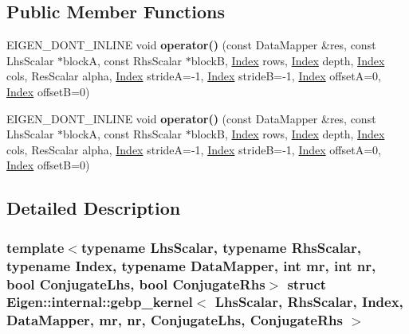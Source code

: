 \subsection*{Public Member Functions}
\begin{DoxyCompactItemize}
\item 
\mbox{\label{struct_eigen_1_1internal_1_1gebp__kernel_afd8f51fe544ebb1106bbae9698f8a1de}} 
E\+I\+G\+E\+N\+\_\+\+D\+O\+N\+T\+\_\+\+I\+N\+L\+I\+NE void {\bfseries operator()} (const Data\+Mapper \&res, const Lhs\+Scalar $\ast$blockA, const Rhs\+Scalar $\ast$blockB, \hyperlink{namespace_eigen_a62e77e0933482dafde8fe197d9a2cfde}{Index} rows, \hyperlink{namespace_eigen_a62e77e0933482dafde8fe197d9a2cfde}{Index} depth, \hyperlink{namespace_eigen_a62e77e0933482dafde8fe197d9a2cfde}{Index} cols, Res\+Scalar alpha, \hyperlink{namespace_eigen_a62e77e0933482dafde8fe197d9a2cfde}{Index} strideA=-\/1, \hyperlink{namespace_eigen_a62e77e0933482dafde8fe197d9a2cfde}{Index} strideB=-\/1, \hyperlink{namespace_eigen_a62e77e0933482dafde8fe197d9a2cfde}{Index} offsetA=0, \hyperlink{namespace_eigen_a62e77e0933482dafde8fe197d9a2cfde}{Index} offsetB=0)
\item 
\mbox{\label{struct_eigen_1_1internal_1_1gebp__kernel_afd8f51fe544ebb1106bbae9698f8a1de}} 
E\+I\+G\+E\+N\+\_\+\+D\+O\+N\+T\+\_\+\+I\+N\+L\+I\+NE void {\bfseries operator()} (const Data\+Mapper \&res, const Lhs\+Scalar $\ast$blockA, const Rhs\+Scalar $\ast$blockB, \hyperlink{namespace_eigen_a62e77e0933482dafde8fe197d9a2cfde}{Index} rows, \hyperlink{namespace_eigen_a62e77e0933482dafde8fe197d9a2cfde}{Index} depth, \hyperlink{namespace_eigen_a62e77e0933482dafde8fe197d9a2cfde}{Index} cols, Res\+Scalar alpha, \hyperlink{namespace_eigen_a62e77e0933482dafde8fe197d9a2cfde}{Index} strideA=-\/1, \hyperlink{namespace_eigen_a62e77e0933482dafde8fe197d9a2cfde}{Index} strideB=-\/1, \hyperlink{namespace_eigen_a62e77e0933482dafde8fe197d9a2cfde}{Index} offsetA=0, \hyperlink{namespace_eigen_a62e77e0933482dafde8fe197d9a2cfde}{Index} offsetB=0)
\end{DoxyCompactItemize}


\subsection{Detailed Description}
\subsubsection*{template$<$typename Lhs\+Scalar, typename Rhs\+Scalar, typename Index, typename Data\+Mapper, int mr, int nr, bool Conjugate\+Lhs, bool Conjugate\+Rhs$>$\newline
struct Eigen\+::internal\+::gebp\+\_\+kernel$<$ Lhs\+Scalar, Rhs\+Scalar, Index, Data\+Mapper, mr, nr, Conjugate\+Lhs, Conjugate\+Rhs $>$}



